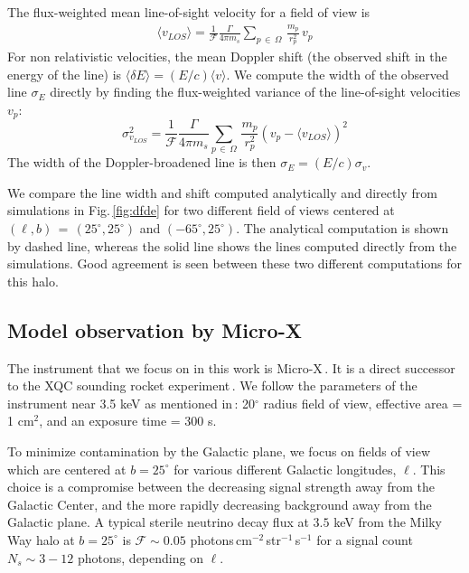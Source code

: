 \documentclass[aps,prd,10pt,twocolumn,superscriptaddress,showpacs]{revtex4-1}
\begin{document}
The flux-weighted mean line-of-sight velocity for a field of view is 
\begin{eqnarray} 
	\langle v_{LOS} \rangle =\frac{1}{\mathcal{F}} \frac{\Gamma}{4\pi m_s} \sum_{p \, \in \, \Omega}
	\, \frac{m_p}{r_p^{2}} \, v_p
\label{eq:simcenter}
\end{eqnarray}
For non relativistic velocities, the mean Doppler shift (the observed shift in the energy of the line) is $\langle \delta E\rangle = (E/c)\langle v \rangle$.  We compute the width of the observed line $\sigma_E$ directly by finding the flux-weighted
variance of the line-of-sight velocities $v_p$:
\begin{equation} 
	\sigma_{v_{LOS}}^2 =\frac{1}{\mathcal{F}} \frac{\Gamma}{4\pi m_s} \sum_{p \, \in \, \Omega}
	\, \frac{m_p}{r_p^{2}} \left(v_p-\langle v_{LOS}\rangle\right)^2 
\label{eq:simsigma}
\end{equation}
The width of the Doppler-broadened line is then $\sigma_E = (E/c) \sigma_v$. 

We compare the line width and shift computed analytically and directly from simulations in Fig.\,\ref{fig:dfde} for two different field of views centered at $(\ell, b) \, = \, (25^\circ, 25^\circ)$ and $(-65^\circ, 25^\circ)$.  The analytical computation is shown by dashed line, whereas the solid line shows the lines computed directly from the simulations.  Good agreement is seen between these two different computations for this halo.

\subsection{Model observation by Micro-X}
\label{sec:microx}

The instrument that we focus on in this work is Micro-X\,\cite{Figueroa-Feliciano:2015gwa}.  It is a
direct successor to the XQC sounding rocket
experiment\,\cite{McCammon:2002gb,Boyarsky:2006hr,Crowder:2012ts}.  We follow the parameters of the
instrument near 3.5 keV as mentioned in\,\cite{Figueroa-Feliciano:2015gwa}: 20$^\circ$ radius field
of view, effective area = 1 cm$^2$, and an exposure time = 300 s. 

To minimize contamination by the Galactic plane, we focus on fields of view which are centered at $b = 25^\circ$ for various different Galactic longitudes, $\ell$.  This choice is a compromise between the decreasing signal strength away from the Galactic Center, and the more rapidly decreasing background away from the Galactic plane.  A typical sterile neutrino decay flux at $3.5$ keV from
the Milky Way halo at $b=25^\circ$ is $\mathcal{F}\sim 0.05$ photons\,cm$^{-2}$\,str$^{-1}$\,s$^{-1}$ 
for a signal count $N_s \sim 3-12$ photons, depending on $\ell$. 
\end{document}
